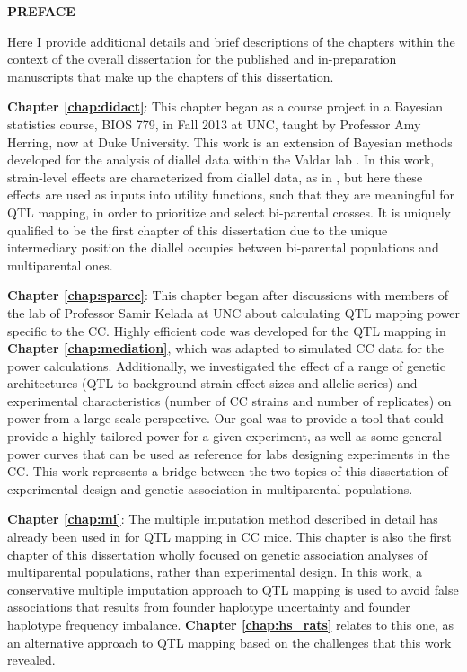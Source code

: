 \begin{center}
\vspace*{52pt}
{\large \textbf{PREFACE}}
\end{center}

Here I provide additional details and brief descriptions of the chapters within the context of the overall dissertation for the published and in-preparation manuscripts that make up the chapters of this dissertation.

\textbf{Chapter \ref{chap:didact}}: This chapter began as a course project in a Bayesian statistics course, BIOS 779, in Fall 2013 at UNC, taught by Professor Amy Herring, now at Duke University. This work is an extension of Bayesian methods developed for the analysis of diallel data within the Valdar lab \citep{Lenarcic2012,Phillippi2014,Crowley2014,Maurizio2017,Turner2017}. In this work, strain-level effects are characterized from diallel data, as in \cite{Lenarcic2012}, but here these effects are used as inputs into utility functions, such that they are meaningful for QTL mapping, in order to prioritize and select bi-parental crosses. It is uniquely qualified to be the first chapter of this dissertation due to the unique intermediary position the diallel occupies between bi-parental populations and multiparental ones.

\textbf{Chapter \ref{chap:sparcc}}: This chapter began after discussions with members of the lab of Professor Samir Kelada at UNC about calculating QTL mapping power specific to the CC. Highly efficient code was developed for the QTL mapping in \textbf{Chapter \ref{chap:mediation}}, which was adapted to simulated CC data for the power calculations. Additionally, we investigated the effect of a range of genetic architectures (QTL to background strain effect sizes and allelic series) and experimental characteristics (number of CC strains and number of replicates) on power from a large scale perspective. Our goal was to provide a tool that could provide a highly tailored power for a given experiment, as well as some general power curves that can be used as reference for labs designing experiments in the CC. This work represents a bridge between the two topics of this dissertation of experimental design and genetic association in multiparental populations.

\textbf{Chapter \ref{chap:mi}}: The multiple imputation method described in detail has already been used in \cite{Mosedale2017} for QTL mapping in CC mice. This chapter is also the first chapter of this dissertation wholly focused on genetic association analyses of multiparental populations, rather than experimental design. In this work, a conservative multiple imputation approach to QTL mapping is used to avoid false associations that results from founder haplotype uncertainty and founder haplotype frequency imbalance. \textbf{Chapter \ref{chap:hs_rats}} relates to this one, as an alternative approach to QTL mapping based on the challenges that this work revealed.


